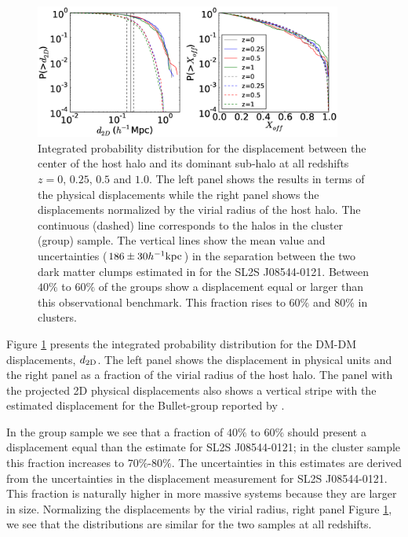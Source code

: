 \documentclass{emulateapj}
\newcommand{\hkpc}{{\ifmmode{h^{-1}{\rm kpc}}\else{$h^{-1}$kpc }\fi}}
\newcommand{\bullg}{SL2S J08544-0121}
\begin{document}
\begin{figure}
\begin{center}
\includegraphics[width=0.9\textwidth]{figure_1.eps}
\end{center}
\caption{
  Integrated probability distribution for the displacement between the
  center of the host halo and its dominant sub-halo at all redshifts
  $z=0$, $0.25$, $0.5$ and $1.0$. The left panel
  shows the results in terms of the physical displacements while the
  right panel shows the displacements normalized by the virial radius
  of the host halo. The continuous (dashed) line corresponds to the halos in the
  cluster (group) sample.
  The vertical lines show the mean value and uncertainties ($186\pm
  30\hkpc$) in the  separation between the two dark matter clumps
  estimated in \citet{Gastaldello} for the \bullg. Between $40\%$
  to $60\%$ of the groups show a displacement equal or larger than
  this observational benchmark. This fraction rises to $60\%$ and
  $80\%$ in clusters.}
\label{fig:displacement}
\end{figure}

Figure \ref{fig:displacement} presents the integrated
probability distribution for the DM-DM displacements, $d_{\rm 2D}$. The
left panel shows the displacement in physical units and the right
panel as a fraction of the virial radius of the host halo.  The panel
with the projected 2D physical displacements also shows a vertical
stripe with the estimated displacement for the Bullet-group reported
by \cite{Gastaldello}.   

In the group sample we see that a fraction of
$40\%$ to $60\%$  should present a displacement equal than the
estimate for \bullg; in the cluster sample this fraction increases to
$70\%$-$80\%$. The uncertainties in this estimates are derived from
the uncertainties in the displacement measurement for \bullg. This
fraction is naturally higher in more massive systems because they are
larger in size. Normalizing the displacements by the virial radius,
right panel Figure \ref{fig:displacement}, we see that the
distributions are similar for the two samples at all redshifts.
\end{document}

